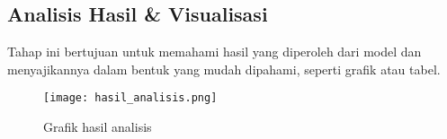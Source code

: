 \begin{subs}
	\subsection{Analisis Hasil \& Visualisasi}
	Tahap ini bertujuan untuk memahami hasil yang diperoleh dari model dan menyajikannya dalam bentuk yang mudah dipahami, seperti grafik atau tabel.
	\begin{figure}[H]
		\centering
		\texttt{[image: hasil\_analisis.png]}
		\caption{Grafik hasil analisis}
	\end{figure}


\end{subs}

